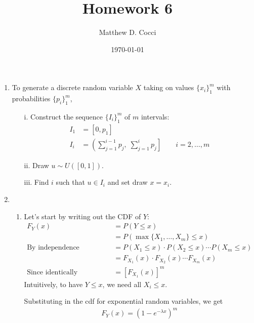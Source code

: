 \documentclass[12pt]{article}
\author{Matthew D. Cocci}
\title{Homework 6}
\date{\today}
\theoremstyle{plain}
\theoremstyle{definition}
\theoremstyle{remark}
\begin{document}
\maketitle



\begin{enumerate}
  \item %
    To generate a discrete random variable $X$ taking on values
    $\{x_i\}_1^m$ with probabilities $\{p_i\}_1^m$,
    \begin{enumerate}
      \item[i.] Construct the sequence $\{I_i\}_1^m$ of $m$ intervals:
        \begin{align*}
          I_1 &= [0, p_1] \\
          I_i &= \left(\sum_{j=1}^{i-1} p_j, \; \sum_{j=1}^{i} p_j\right]
          \qquad i = 2, \ldots, m
        \end{align*}
      \item[ii.] Draw $u \sim U([0,1])$.
      \item[iii.] Find $i$ such that $u\in I_i$ and set draw $x = x_i$.
    \end{enumerate}

  \item %
    \begin{enumerate}
      \item %
        Let's start by writing out the CDF of $Y$:
        \begin{align*}
          F_Y(x) &= P(Y \leq x)  \\
          &= P(\max\{X_1, \ldots,X_m\} \leq x)  \\
          \text{By independence} \qquad
            &= P(X_1 \leq x) \cdot P(X_2 \leq x)\cdots P(X_m\leq x) \\
          &= F_{X_1}(x) \cdot F_{X_2}(x) \cdots F_{X_m}(x) \\
          \text{Since identically distributed} \qquad
            &= \left[F_{X_1}(x)\right]^m
        \end{align*}
        Intuitively, to have $Y \leq x$, we need all $X_i \leq x$.

        Substituting in the cdf for exponential random variables, we get
        \begin{align*}
          F_Y(x) = \left( 1-e^{-\lambda x} \right)^m
        \end{align*}


\end{enumerate}
\end{enumerate}
\end{document}
